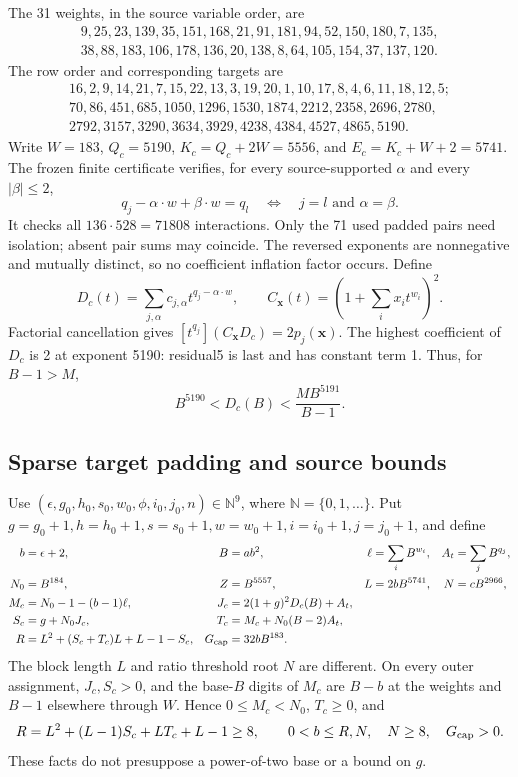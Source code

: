 The 31 weights, in the source variable order, are
\[
\begin{gathered}
9,25,23,139,35,151,168,21,91,181,94,52,150,180,7,135,\\
38,88,183,106,178,136,20,138,8,64,105,154,37,137,120.
\end{gathered}
\]
The row order and corresponding targets are
\[
\begin{gathered}
16,2,9,14,21,7,15,22,13,3,19,20,1,10,17,8,4,6,11,18,12,5;\\
70,86,451,685,1050,1296,1530,1874,2212,2358,2696,2780,\\
2792,3157,3290,3634,3929,4238,4384,4527,4865,5190.
\end{gathered}
\]
Write \(W=183\), \(Q_c=5190\), \(K_c=Q_c+2W=5556\), and
\(E_c=K_c+W+2=5741\). The frozen finite certificate verifies, for every
source-supported \(\alpha\) and every \(|\beta|\leq2\),
\[
 q_j-\alpha\cdot w+\beta\cdot w=q_l
       \quad\Longleftrightarrow\quad j=l\text{ and }\alpha=\beta.
\]
It checks all \(136\cdot528=71808\) interactions. Only the 71 used
padded pairs need isolation; absent pair sums may coincide. The reversed
exponents are nonnegative and mutually distinct, so no coefficient inflation
factor occurs. Define
\[
 D_c(t)=\sum_{j,\alpha}c_{j,\alpha}t^{q_j-\alpha\cdot w},\qquad
 C_{\mathbf x}(t)=\left(1+\sum_i x_it^{w_i}\right)^2.
\]
Factorial cancellation gives
\([t^{q_j}](C_{\mathbf x}D_c)=2p_j(\mathbf x)\).
The highest coefficient of \(D_c\) is 2 at exponent 5190: residual5 is
last and has constant term 1. Thus, for \(B-1>M\),
\[
 B^{5190}<D_c(B)<\frac{M B^{5191}}{B-1}.
\]

\subsection{Sparse target padding and source bounds}
Use \((\epsilon,g_0,h_0,s_0,w_0,\phi,i_0,j_0,n)\in\mathbb N^9\),
where \(\mathbb N=\{0,1,\ldots\}\). Put
\(g=g_0+1,h=h_0+1,s=s_0+1,w=w_0+1,i=i_0+1,j=j_0+1\), and define
\begin{align*}
 b&=\epsilon+2,& B&=ab^2,& \ell&=\sum_iB^{w_i},& A_t&=\sum_jB^{q_j},\\
 N_0&=B^{184},& Z&=B^{5557},& L&=2bB^{5741},& N&=cB^{2966},\\
 M_c&=N_0-1-(b-1)\ell,&
 J_c&=2(1+g)^2D_c(B)+A_t,\\
 S_c&=g+N_0J_c,&T_c&=M_c+N_0(B-2)A_t,\\
 R&=L^2+(S_c+T_c)L+L-1-S_c,&G_{\rm cap}&=32bB^{183}.
\end{align*}
The block length \(L\) and ratio threshold root \(N\) are different.
On every outer assignment, \(J_c,S_c>0\), and the base-\(B\) digits of
\(M_c\) are \(B-b\) at the weights and \(B-1\) elsewhere through \(W\).
Hence \(0\leq M_c<N_0\), \(T_c\geq0\), and
\[
 R=L^2+(L-1)S_c+LT_c+L-1\geq8,\qquad
 0<b\leq R,N,\quad N\geq8,\quad G_{\rm cap}>0.
\]
These facts do not presuppose a power-of-two base or a bound on \(g\).

